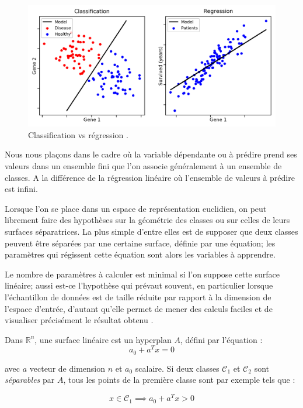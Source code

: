 	\begin{figure}[bth]%
		\centering
		\includegraphics[width=15cm]{images/classification_vs_regression.png}
		\caption[Classification vs Régression.]{Classification vs régression \cite{ml2008python}.}
		\label{fig:class_vs_reg}
	\end{figure}
	
	Nous nous plaçons dans le cadre où la variable dépendante ou à prédire prend ses valeurs dans un ensemble fini que l'on associe généralement à un ensemble de classes. A la différence de la régression linéaire où l’ensemble de valeurs à prédire est infini.
	
	Lorsque l'on se place dans un espace de représentation euclidien, on peut librement faire des hypothèses sur la géométrie des classes ou sur celles de leurs surfaces séparatrices. La plus simple d'entre elles est de supposer que deux classes peuvent être séparées par une certaine surface, définie par une équation; les paramètres qui régissent cette équation sont alors les variables à apprendre.
	
	Le nombre de paramètres à calculer est minimal si l'on suppose cette surface linéaire; aussi est-ce l'hypothèse qui prévaut souvent, en particulier lorsque l'échantillon de données est de taille réduite par rapport à la dimension de l'espace d'entrée, d'autant qu'elle permet de mener des calculs faciles et de visualiser précisément le résultat obtenu \cite{sarkar2017practical}.
	
	Dans $\mathbb{R}^n$, une surface linéaire est un hyperplan $A$, défini par l'équation :
	$$ 
	a_0  + a^Tx = 0
	$$
	
	avec $a$ vecteur de dimension $n$ et $a_0$ scalaire. Si deux classes $\mathcal{C}_1$ et $\mathcal{C}_2$ sont \textit{séparables} par $A$, tous les points de la première classe sont par exemple tels que :
	
	\begin{equation}\label{eq:x_case_c1}
	x \in \mathcal{C}_1 \implies a_0 + a^Tx > 0
	\end{equation}
	
